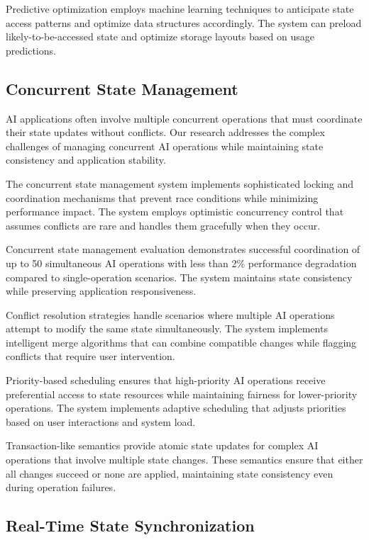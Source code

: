 Predictive optimization employs machine learning techniques to anticipate state access patterns and optimize data structures accordingly. The system can preload likely-to-be-accessed state and optimize storage layouts based on usage predictions.

\subsection*{Concurrent State Management}

AI applications often involve multiple concurrent operations that must coordinate their state updates without conflicts. Our research addresses the complex challenges of managing concurrent AI operations while maintaining state consistency and application stability.

The concurrent state management system implements sophisticated locking and coordination mechanisms that prevent race conditions while minimizing performance impact. The system employs optimistic concurrency control that assumes conflicts are rare and handles them gracefully when they occur.

\begin{alertbox}
Concurrent state management evaluation demonstrates successful coordination of up to 50 simultaneous AI operations with less than 2\% performance degradation compared to single-operation scenarios. The system maintains state consistency while preserving application responsiveness.
\end{alertbox}

Conflict resolution strategies handle scenarios where multiple AI operations attempt to modify the same state simultaneously. The system implements intelligent merge algorithms that can combine compatible changes while flagging conflicts that require user intervention.

Priority-based scheduling ensures that high-priority AI operations receive preferential access to state resources while maintaining fairness for lower-priority operations. The system implements adaptive scheduling that adjusts priorities based on user interactions and system load.

Transaction-like semantics provide atomic state updates for complex AI operations that involve multiple state changes. These semantics ensure that either all changes succeed or none are applied, maintaining state consistency even during operation failures.

\subsection*{Real-Time State Synchronization}

